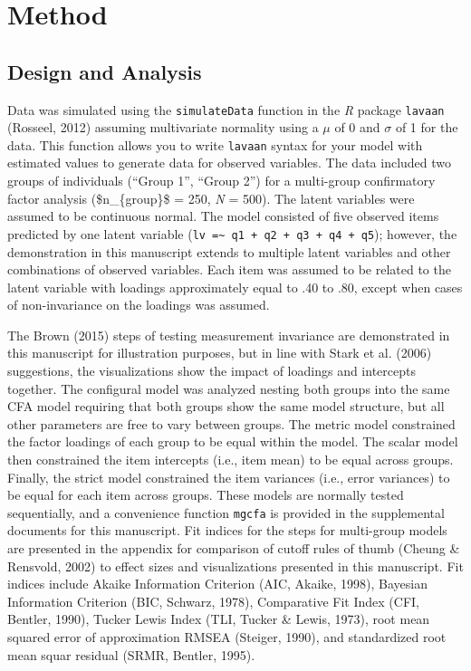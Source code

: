 \documentclass[
  man]{apa6}
\begin{document}
\hypertarget{method}{%
\section{Method}\label{method}}

\hypertarget{design-and-analysis}{%
\subsection{Design and Analysis}\label{design-and-analysis}}

Data was simulated using the \texttt{simulateData} function in the \emph{R} package \texttt{lavaan} (Rosseel, 2012) assuming multivariate normality using a \(\mu\) of 0 and \(\sigma\) of 1 for the data. This function allows you to write \texttt{lavaan} syntax for your model with estimated values to generate data for observed variables. The data included two groups of individuals (``Group 1'', ``Group 2'') for a multi-group confirmatory factor analysis (\$n\_\{group\}\$ = 250, \emph{N} = 500). The latent variables were assumed to be continuous normal. The model consisted of five observed items predicted by one latent variable (\texttt{lv\ =\textasciitilde{}\ q1\ +\ q2\ +\ q3\ +\ q4\ +\ q5}); however, the demonstration in this manuscript extends to multiple latent variables and other combinations of observed variables. Each item was assumed to be related to the latent variable with loadings approximately equal to .40 to .80, except when cases of non-invariance on the loadings was assumed.

The Brown (2015) steps of testing measurement invariance are demonstrated in this manuscript for illustration purposes, but in line with Stark et al. (2006) suggestions, the visualizations show the impact of loadings and intercepts together. The configural model was analyzed nesting both groups into the same CFA model requiring that both groups show the same model structure, but all other parameters are free to vary between groups. The metric model constrained the factor loadings of each group to be equal within the model. The scalar model then constrained the item intercepts (i.e., item mean) to be equal across groups. Finally, the strict model constrained the item variances (i.e., error variances) to be equal for each item across groups. These models are normally tested sequentially, and a convenience function \texttt{mgcfa} is provided in the supplemental documents for this manuscript. Fit indices for the steps for multi-group models are presented in the appendix for comparison of cutoff rules of thumb (Cheung \& Rensvold, 2002) to effect sizes and visualizations presented in this manuscript. Fit indices include Akaike Information Criterion (AIC, Akaike, 1998), Bayesian Information Criterion (BIC, Schwarz, 1978), Comparative Fit Index (CFI, Bentler, 1990), Tucker Lewis Index (TLI, Tucker \& Lewis, 1973), root mean squared error of approximation RMSEA (Steiger, 1990), and standardized root mean squar residual (SRMR, Bentler, 1995).
\end{document}
